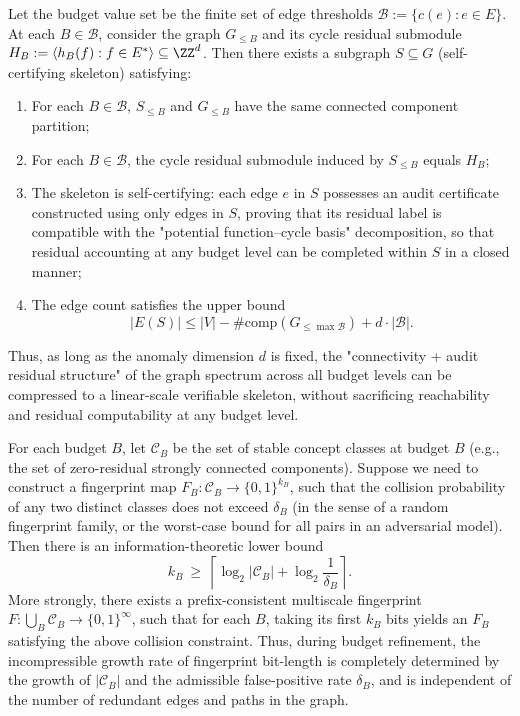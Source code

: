 \begin{conclusion}\label{con:xi-self-certifying-skeleton-all-budgets}
Let the budget value set be the finite set of edge thresholds
\(
\mathcal{B}:=\{c(e):e\in E\}
\).
At each \(B\in\mathcal{B}\), consider the graph \(G_{\le B}\) and its cycle residual submodule
\(
H_B:=\langle h_B(f):f\in E^\ast\rangle\subseteq\ZZ^d
\).
Then there exists a subgraph \(S\subseteq G\) (self-certifying skeleton) satisfying:
\begin{enumerate}
  \item For each \(B\in\mathcal{B}\), \(S_{\le B}\) and \(G_{\le B}\) have the same connected component partition;
  \item For each \(B\in\mathcal{B}\), the cycle residual submodule induced by \(S_{\le B}\) equals \(H_B\);
  \item The skeleton is self-certifying: each edge \(e\) in \(S\) possesses an audit certificate constructed using only edges in \(S\), proving that its residual label is compatible with the "potential function--cycle basis" decomposition, so that residual accounting at any budget level can be completed within \(S\) in a closed manner;
  \item The edge count satisfies the upper bound
  \[
  |E(S)|\le |V|-\#\mathrm{comp}(G_{\le \max\mathcal{B}})+d\cdot|\mathcal{B}|.
  \]
\end{enumerate}
Thus, as long as the anomaly dimension \(d\) is fixed, the "connectivity + audit residual structure" of the graph spectrum across all budget levels can be compressed to a linear-scale verifiable skeleton, without sacrificing reachability and residual computability at any budget level.
\end{conclusion}

\begin{conclusion}\label{con:xi-multiscale-fingerprint-optimal-bitlength}
For each budget \(B\), let \(\mathcal{C}_B\) be the set of stable concept classes at budget \(B\) (e.g., the set of zero-residual strongly connected components).
Suppose we need to construct a fingerprint map \(F_B:\mathcal{C}_B\to\{0,1\}^{k_B}\), such that the collision probability of any two distinct classes does not exceed \(\delta_B\) (in the sense of a random fingerprint family, or the worst-case bound for all pairs in an adversarial model).
Then there is an information-theoretic lower bound
\[
k_B\ \ge\ \left\lceil \log_2 |\mathcal{C}_B|+\log_2\frac1{\delta_B}\right\rceil.
\]
More strongly, there exists a prefix-consistent multiscale fingerprint
\(
F:\bigcup_B \mathcal{C}_B\to\{0,1\}^\infty
\),
such that for each \(B\), taking its first \(k_B\) bits yields an \(F_B\) satisfying the above collision constraint.
Thus, during budget refinement, the incompressible growth rate of fingerprint bit-length is completely determined by the growth of \(|\mathcal{C}_B|\) and the admissible false-positive rate \(\delta_B\), and is independent of the number of redundant edges and paths in the graph.
\end{conclusion}


